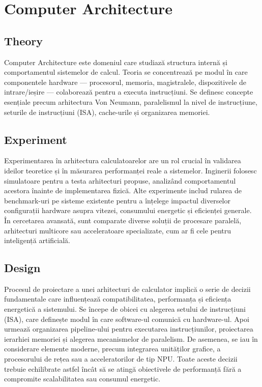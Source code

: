 \documentclass[12pt, letterpaper]{article}
\begin{document}
\newpage

\section{Computer Architecture}

\subsection*{Theory}
Computer Architecture este domeniul care studiază structura internă și comportamentul sistemelor de calcul. Teoria se concentrează pe modul în care componentele hardware — procesorul, memoria, magistralele, dispozitivele de intrare/ieșire — colaborează pentru a executa instrucțiuni. Se definesc concepte esențiale precum arhitectura Von Neumann, paralelismul la nivel de instrucțiune, seturile de instrucțiuni (ISA), cache-urile și organizarea memoriei.

\subsection*{Experiment}
Experimentarea în arhitectura calculatoarelor are un rol crucial în validarea ideilor teoretice și în măsurarea performanței reale a sistemelor. Inginerii folosesc simulatoare pentru a testa arhitecturi propuse, analizând comportamentul acestora înainte de implementarea fizică. Alte experimente includ rularea de benchmark-uri pe sisteme existente pentru a înțelege impactul diverselor configurații hardware asupra vitezei, consumului energetic și eficienței generale. În cercetarea avansată, sunt comparate diverse soluții de procesare paralelă, arhitecturi multicore sau acceleratoare specializate, cum ar fi cele pentru inteligență artificială.

\subsection*{Design}
Procesul de proiectare a unei arhitecturi de calculator implică o serie de decizii fundamentale care influențează compatibilitatea, performanța și eficiența energetică a sistemului. Se începe de obicei cu alegerea setului de instrucțiuni (ISA), care definește modul în care software-ul comunică cu hardware-ul. Apoi urmează organizarea pipeline-ului pentru executarea instrucțiunilor, proiectarea ierarhiei memoriei și alegerea mecanismelor de paralelism. De asemenea, se iau în considerare elemente moderne, precum integrarea unităților grafice, a procesorului de rețea sau a acceleratorilor de tip NPU. Toate aceste decizii trebuie echilibrate astfel încât să se atingă obiectivele de performanță fără a compromite scalabilitatea sau consumul energetic.
\end{document}

